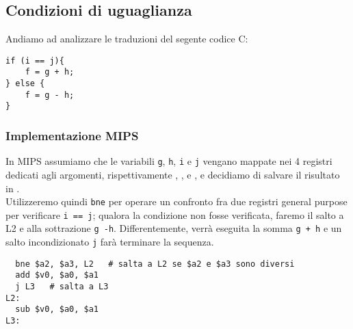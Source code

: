 \documentclass[class=book, crop=false, oneside]{standalone}
\begin{document}
\subsection*{Condizioni di uguaglianza}
Andiamo ad analizzare le traduzioni del segente codice C:
\begin{verbatim}
if (i == j){
	f = g + h;
} else {
	f = g - h;
}
\end{verbatim}
\subsubsection{Implementazione MIPS}
In MIPS assumiamo che le variabili \texttt{g}, \texttt{h}, \texttt{i} e \texttt{j} vengano mappate nei 4 registri dedicati agli argomenti, rispettivamente , ,  e , e decidiamo di salvare il risultato in .\\
Utilizzeremo quindi \texttt{bne} per operare un confronto fra due registri general purpose per verificare \texttt{i == j}; qualora la condizione non fosse verificata, faremo il salto a L2 e alla sottrazione \texttt{g -h}. Differentemente, verrà eseguita la somma \texttt{g + h} e un salto incondizionato \texttt{j} farà terminare la sequenza.
\begin{verbatim}
  bne $a2, $a3, L2   # salta a L2 se $a2 e $a3 sono diversi
  add $v0, $a0, $a1
  j L3   # salta a L3
L2:
  sub $v0, $a0, $a1
L3:
\end{verbatim}
\end{document}
